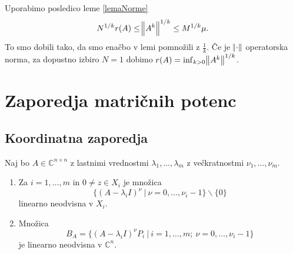 \documentclass[mat1]{fmfdelo}
\newcommand{\C}{\mathbb C}
\begin{document}
\begin{dokaz}
    Uporabimo posledico leme \ref{lemaNorme}
    \begin{equation*}
        N^{1/k} r(A) \leq \norm{A^k}^{1/k} \leq M^{1/k} \mu.
    \end{equation*}
    To smo dobili tako, da smo enačbo v lemi pomnožili z $\frac{1}{k}$. Če je $\norm{\cdot}$ operatorska norma, za dopustno izbiro $N = 1$ dobimo $r(A) = \inf_{k > 0} \norm{A^k}^{1/k}$.
\end{dokaz}


\section{Zaporedja matričnih potenc}
\subsection{Koordinatna zaporedja}
\begin{lema}\label{lemaNeodvisnost}
    Naj bo $A \in \C^{n \times n}$ z lastnimi vrednostmi $\lambda_1, \ldots, \lambda_m$ z večkratnostmi $\nu_1, \ldots, \nu_m$.
    \begin{enumerate}
        \item Za $i = 1, \ldots, m$ in $0\neq z \in X_i$ je množica
                 \begin{equation}
                     \{(A-\lambda_i I)^{\nu}\ |\ \nu = 0, \ldots, \nu_i - 1\} \backslash \{0\}
                 \end{equation}
                linearno neodvisna v $X_i$.
        \item Množica
                 \begin{equation}
                     B_A = \{(A-\lambda_i I)^{\nu} P_i\ |\ i = 1, \ldots, m;\ \nu = 0, \ldots, \nu_i - 1\}
                 \end{equation}
                je linearno neodvisna v $\C^n$.
    \end{enumerate}
\end{lema}
\end{document}

